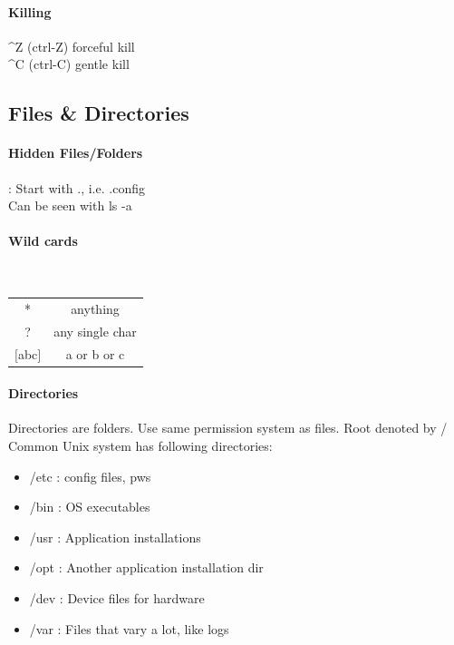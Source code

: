 \documentclass[12 pt]{article}
\begin{document}
	\paragraph{Killing}
	\textasciicircum Z (ctrl-Z) forceful kill
	\\\textasciicircum C (ctrl-C) gentle kill
	\subsection{Files \& Directories}
	\paragraph{Hidden Files/Folders}: Start with ., i.e. .config \\ Can be seen with ls -a
	\paragraph{Wild cards}
	~\\\begin{tabular}{c|c}
		* & anything
		\\ ? & any single char 
		\\ $[$abc$]$ & a or b or c
	\end{tabular}
	\paragraph{Directories} Directories are folders. Use same permission system as files. Root denoted by /
	\\ Common Unix system has following directories:
	\begin{itemize}
		\item /etc : config files, pws
		\item /bin : OS executables
		\item /usr : Application installations
		\item /opt : Another application installation dir
		\item /dev : Device files for hardware
		\item /var : Files that vary a lot, like logs
	\end{itemize}
\end{document}
